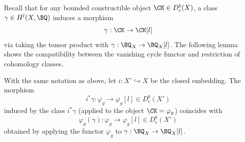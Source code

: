 Recall that for any bounded constructible object $\CK \in D^b_c(X)$, a class $\gamma \in H^l(X, \BQ)$ induces a morphism
\[
\gamma: \CK \to \CK [l]
\]
via taking the tensor product with $\gamma: \BQ_X \to \BQ_X[l]$. The following lemma shows the compatibility between the vanishing cycle functor and restriction of cohomology classes.

\begin{lem}
\notready\label{lem1.3}
With the same notation as above, let $i: X'\hookrightarrow X$ be the closed embedding. The morphism \[
i^*\gamma: \varphi_g \rightarrow \varphi_g[l] \in D^b_c(X')
\]
induced by the class $i^*\gamma$ (applied to the object $\CK = \varphi_g$) coincides with
\[
\varphi_g(\gamma): \varphi_g \to \varphi_g[l] \in D_c^b(X')
\]
obtained by applying the functor $\varphi_g$ to $\gamma: \BQ_X \to \BQ_X[l]$.
\end{lem}


